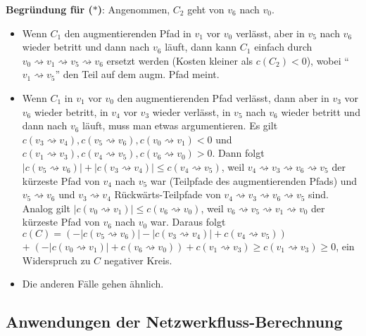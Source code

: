 \textbf{Begründung für ($\ast$)}:
Angenommen, $C_2$ geht von $v_6$ nach $v_0$.
\begin{itemize}
    \item
    Wenn $C_1$ den augmentierenden Pfad in $v_1$ vor $v_0$ verlässt, aber in $v_5$ nach $v_6$
    wieder betritt und dann nach $v_6$ läuft, dann kann $C_1$ einfach durch
    $v_0 \rightsquigarrow v_1 \rightsquigarrow v_5 \rightsquigarrow v_6$
    ersetzt werden (Kosten kleiner als $c(C_2) < 0$),
    wobei "`$v_1 \rightsquigarrow v_5$"' den Teil auf dem augm. Pfad meint.

    \item
    Wenn $C_1$ in $v_1$ vor $v_0$ den augmentierenden Pfad verlässt, dann aber in $v_3$ vor $v_6$
    wieder betritt, in $v_4$ vor $v_3$ wieder verlässt, in $v_5$ nach $v_6$ wieder betritt und
    dann nach $v_6$ läuft, muss man etwas argumentieren.
    Es gilt $c(v_3 \rightsquigarrow v_4), c(v_5 \rightsquigarrow v_6),
    c(v_0 \rightsquigarrow v_1) < 0$ und
    $c(v_1 \rightsquigarrow v_3), c(v_4 \rightsquigarrow v_5), c(v_6 \rightsquigarrow v_0) > 0$.
    Dann folgt $|c(v_5 \rightsquigarrow v_6)| + |c(v_3 \rightsquigarrow v_4)| \le
    c(v_4 \rightsquigarrow v_5)$, weil
    $v_4 \rightsquigarrow v_3 \rightsquigarrow v_6 \rightsquigarrow v_5$ der kürzeste Pfad von
    $v_4$ nach $v_5$ war (Teilpfade des augmentierenden Pfads)
    und $v_5 \rightsquigarrow v_6$ und $v_3 \rightsquigarrow v_4$ Rückwärts-Teilpfade von
    $v_4 \rightsquigarrow v_3 \rightsquigarrow v_6 \rightsquigarrow v_5$ sind.
    Analog gilt $|c(v_0 \rightsquigarrow v_1)| \le c(v_6 \rightsquigarrow v_0)$,
    weil $v_6 \rightsquigarrow v_5 \rightsquigarrow v_1 \rightsquigarrow v_0$ der kürzeste Pfad von
    $v_6$ nach $v_0$ war.
    Daraus folgt $c(C) =
    (-|c(v_5 \rightsquigarrow v_6)| - |c(v_3 \rightsquigarrow v_4)| +
    c(v_4 \rightsquigarrow v_5))$\\
    $+\; (-|c(v_0 \rightsquigarrow v_1)| + c(v_6 \rightsquigarrow v_0)) + c(v_1 \rightsquigarrow v_3)
    \ge c(v_1 \rightsquigarrow v_3) \ge 0$,
    ein Widerspruch zu $C$ negativer Kreis.

    \item
    Die anderen Fälle gehen ähnlich.
\end{itemize}

\subsection{%
    Anwendungen der Netzwerkfluss-Berechnung%
}

